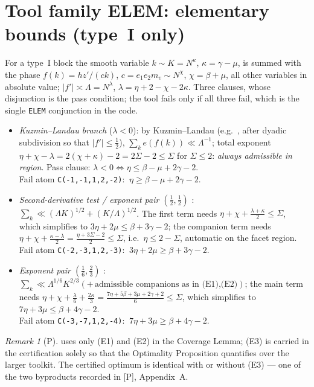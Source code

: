 \documentclass[11pt]{article}
\theoremstyle{remark}
\newtheorem{remark}[lemma]{Remark}
\newcommand{\N}{N}
\newcommand{\eof}[1]{e\!\left(#1\right)}
\newcommand{\code}[1]{\texttt{#1}}
\begin{document}
\section{Tool family ELEM: elementary bounds (type~I only)}
\label{sec:elem}

For a type~I block the smooth variable $k\sim K=\N^{\kappa}$,
$\kappa=\gamma-\mu$, is summed with the phase $f(k)=hz'/(ck)$,
$c=e_1e_2m_v\sim\N^{\chi}$, $\chi=\beta+\mu$, all other variables in
absolute value; $|f'|\asymp\Lambda=\N^{\lambda}$,
$\lambda=\eta+2-\chi-2\kappa$. Three clauses, whose disjunction is the
pass condition; the tool fails only if all three fail, which is the
single \code{ELEM} conjunction in the code.

\begin{itemize}
\item[(E1)] \emph{Kuzmin--Landau branch} ($\lambda<0$): by
Kuzmin--Landau (e.g.\ \cite[Theorem~2.1]{GK}, after dyadic subdivision
so that $|f'|\le\tfrac12$), $\sum_k\eof{f(k)}\ll\Lambda^{-1}$; total
exponent $\eta+\chi-\lambda=2(\chi+\kappa)-2=2\Sigma-2\le\Sigma$ for
$\Sigma\le2$: \emph{always admissible in region}. Pass clause:
$\lambda<0\iff\eta\le\beta-\mu+2\gamma-2$.\\
Fail atom \code{C(-1,-1,1,2,-2)}: $\ \eta\ge\beta-\mu+2\gamma-2$.
\item[(E2)] \emph{Second-derivative test / exponent pair
$(\tfrac12,\tfrac12)$} \cite[Theorem~2.2]{GK}:
$\sum_k\ll(\Lambda K)^{1/2}+(K/\Lambda)^{1/2}$. The first term needs
$\eta+\chi+\tfrac{\lambda+\kappa}{2}\le\Sigma$, which simplifies to
$3\eta+2\mu\le\beta+3\gamma-2$; the companion term needs
$\eta+\chi+\tfrac{\kappa-\lambda}{2}=\tfrac{\eta+3\Sigma-2}{2}\le\Sigma$,
i.e.\ $\eta\le2-\Sigma$, automatic on the facet region.\\
Fail atom \code{C(-2,-3,1,2,-3)}: $\ 3\eta+2\mu\ge\beta+3\gamma-2$.
\item[(E3)] \emph{Exponent pair $(\tfrac16,\tfrac23)$}
\cite[\S3]{GK}: $\sum_k\ll\Lambda^{1/6}K^{2/3}(+\,\text{admissible
companions as in (E1),(E2)})$; the main term needs
$\eta+\chi+\tfrac{\lambda}{6}+\tfrac{2\kappa}{3}
=\tfrac{7\eta+5\beta+3\mu+2\gamma+2}{6}\le\Sigma$, which simplifies to
$7\eta+3\mu\le\beta+4\gamma-2$.\\
Fail atom \code{C(-3,-7,1,2,-4)}: $\ 7\eta+3\mu\ge\beta+4\gamma-2$.
\end{itemize}

\begin{remark}
[P] uses only (E1) and (E2) in the Coverage Lemma; (E3) is carried in
the certification solely so that the Optimality Proposition quantifies
over the larger toolkit. The certified optimum is identical with or
without (E3) --- one of the two byproducts recorded in [P],
Appendix~A.
\end{remark}
\end{document}
